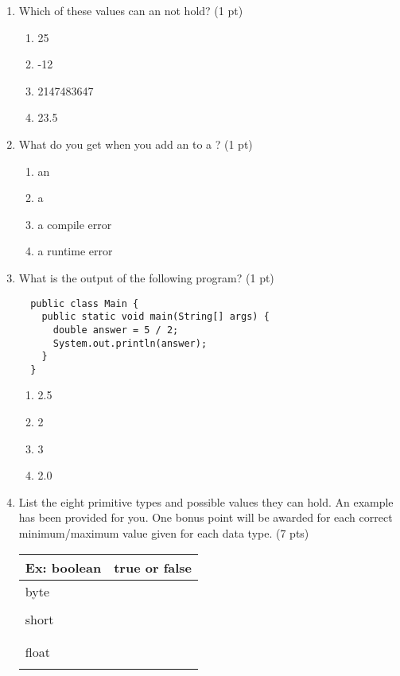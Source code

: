 \documentclass[11pt,fleqn]{article}
\begin{document}
\begin{enumerate}

\item Which of these values can an  not hold? (1 pt)
	\begin{enumerate}
	\item 25
	\item -12
	\item 2147483647 %
	\item 23.5
	\end{enumerate}

\item What do you get when you add an  to a ? (1 pt)
	\begin{enumerate}
	\item an 
	\item a 
	\item a compile error
	\item a runtime error
	\end{enumerate}

\item What is the output of the following program? (1 pt)
  \begin{verbatim}
  public class Main {
    public static void main(String[] args) {
      double answer = 5 / 2;
      System.out.println(answer);
    }
  }
  \end{verbatim}
	\begin{enumerate}
	\item 2.5
	\item 2
	\item 3
	\item 2.0
	\end{enumerate}

\item List the eight primitive types and possible values they can hold. An example has been provided for you. One bonus point will be awarded for each correct minimum/maximum value given for each data type. (7 pts)
  \begin{center}
    \begin{tabu} to 0.8\textwidth { | X[l] | X[c] | }
      \hline
      Ex: boolean & true or false \\ \hline
      byte &   \\ \hline
      &   \\ \hline
      short &   \\ \hline
      &   \\ \hline
      &   \\ \hline
      float &   \\ \hline
      &   \\ \hline
    \end{tabu}
  \end{center}


\end{enumerate}
\end{document}

